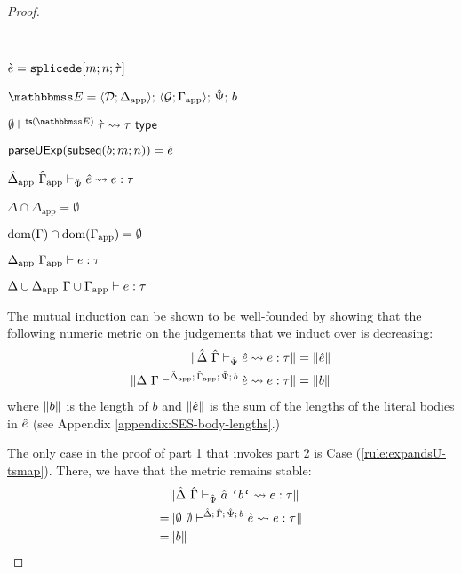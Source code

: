 \begin{proof}
\begin{byCases}
\item[\text{(\ref{rule:cvalidE-U-splicede})}] ~
\begin{pfsteps*}
  \item $\grave{e}=\texttt{splicede}[m; n; \grave{\tau}]$ 
  \item $  \escenev=\esceneU{\uDD{\uD}{\Delta_\text{app}}}{\uGG{\uG}{\Gamma_\text{app}}}{\uPsi}{b}$ 
  \item   $\cvalidT{\emptyset}{\tsfrom{\escenev}}{\ctau}{\tau}$ 
  \item $\mathsf{parseUExp}(\mathsf{subseq}(b; m; n))={\hat e}$ 
  \item $\hat{\Delta}_\text{app}~\hat{\Gamma}_\text{app} \vdash_{\hat{\Psi}} {\hat e} \leadsto e : \tau$  
  \item $\Delta \cap \Delta_\text{app}=\emptyset$  
  \item $\text{dom}(\Gamma) \cap \text{dom}(\Gamma_\text{app})=\emptyset$  
  \item $\Delta_\text{app}~\Gamma_\text{app} \vdash e : \tau$  
  \item ${\Delta}\cup{\Delta_\text{app}}~{\Gamma}\cup{\Gamma_\text{app}} \vdash e : \tau$ 
\end{pfsteps*}
\resetpfcounter
\end{byCases}

The mutual induction can be shown to be well-founded by showing that the following numeric metric on the judgements that we induct over is decreasing:
\begin{align*}
\Vert \hat{\Delta}~\hat{\Gamma} \vdash_{\hat{\Psi}} {\hat e} \leadsto e : \tau \Vert & = \Vert {\hat e} \Vert\\
\Vert \Delta~\Gamma\vdash^{\hat{\Delta}_\text{app};\,\hat{\Gamma}_\text{app};\,\hat{\Psi};\,b} \grave{e} \leadsto e : \tau \Vert & = \Vert b \Vert
\end{align*}
where $\Vert b \Vert$ is the length of $b$ and $\Vert {\hat e} \Vert$ is the sum of the lengths of the literal bodies in ${\hat e}$ (see Appendix \ref{appendix:SES-body-lengths}.)

The only case in the proof of part 1 that invokes part 2 is Case (\ref{rule:expandsU-tsmap}). There, we have that the metric remains stable: \begin{align*}
 & \sizeof{\expandsU{\uDelta}{\uGamma}{\uPsi}{\utsmap{\tsmv}{b}}{e}{\tau}}\\
=& \sizeof{\cvalidE{\emptyset}{\emptyset}{\esceneU{\uDelta}{\uGamma}{\uPsi}{b}}{\ce}{e}{\tau}}\\
=&\sizeof{b}\end{align*}


\end{proof}
